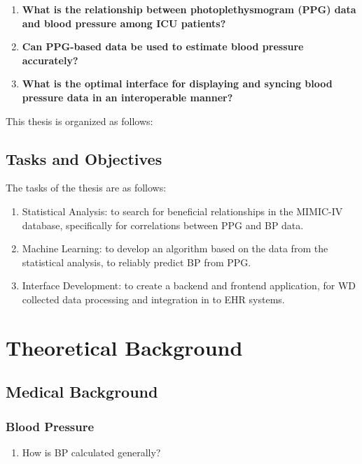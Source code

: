 \documentclass[10pt, bibliography=totoc]{scrartcl}
\begin{document}
\begin{enumerate}
\item \textbf{What is the relationship between photoplethysmogram (PPG) data and blood pressure among ICU patients?}

\item \textbf{Can PPG-based data be used to estimate blood pressure accurately?}

\item \textbf{What is the optimal interface for displaying and syncing blood pressure data in an interoperable manner?}
\end{enumerate}

This thesis is organized as follows:

\subsection{Tasks and Objectives}

The tasks of the thesis are as follows:

\begin{enumerate}
\item Statistical Analysis: to search for beneficial relationships in the MIMIC-IV database, specifically for correlations between PPG and BP data.
\item Machine Learning: to develop an algorithm based on the data from the statistical analysis, to reliably predict BP from PPG. 
\item Interface Development: to create a backend and frontend application, for WD collected data processing and integration in to EHR systems.
\end{enumerate}

\section{Theoretical Background}

\subsection{Medical Background}

\subsubsection{Blood Pressure}

\begin{enumerate}
\item How is BP calculated generally?
\end{enumerate}
\end{document}
